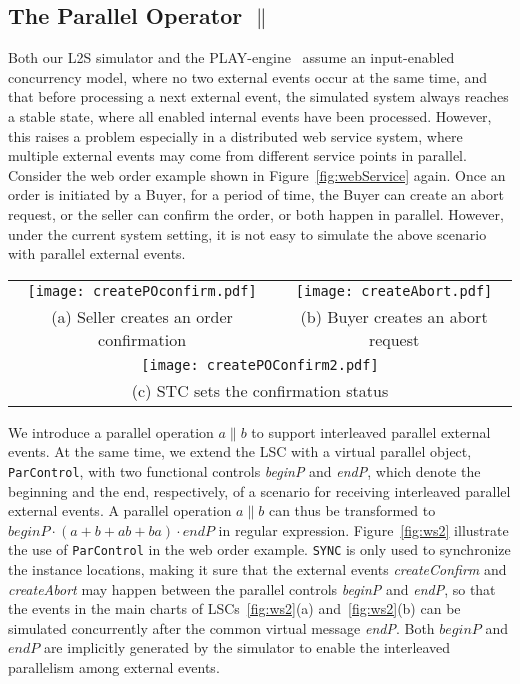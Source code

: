 \documentclass[]{llncs}
\begin{document}
\subsection{The Parallel Operator $\|$}

Both our L2S simulator and the PLAY-engine~\cite{HM03}
assume an input-enabled concurrency model, where no two
external events occur at the same time, and that before processing
a next external event, the simulated system always reaches a stable state,
where all enabled internal events have been processed.
However, this raises a problem especially in a distributed web service system,
where multiple external events may come from different service points in parallel.
Consider the web order example shown in Figure~\ref{fig:webService} again.
Once an order is initiated by a Buyer, for a period of time,
the Buyer can create an abort request, or the seller can confirm
the order, or both happen in parallel.
However, under the current system setting, it is not easy
to simulate the above scenario with parallel external events.

\begin{figure*}[!ht]
	\centering
	\begin{tabular}{cc}
		\texttt{[image: createPOconfirm.pdf]}
		&
		\texttt{[image: createAbort.pdf]} \\
	  (a) Seller creates an order confirmation
	  &
	  (b) Buyer creates an abort request \\
	
\multicolumn{2}{c}{
	  \texttt{[image: createPOConfirm2.pdf]}} \\
\multicolumn{2}{c}{
		  (c) STC sets the confirmation status}
	\end{tabular}
\caption{An LSC specification with a Parallel object}
\label{fig:ws2}
\end{figure*}

We introduce a parallel operation $a \| b$ to support
interleaved parallel external events.
At the same time, we extend the LSC with a virtual parallel object,
{\tt ParControl}, with two functional controls {\em beginP} and {\em endP},
which denote the beginning
and the end, respectively, of a scenario for receiving
interleaved parallel external events. A parallel operation
$a\|b$ can thus be transformed to $beginP\cdot(a+b+ab+ba)\cdot endP$ in regular
expression. Figure~\ref{fig:ws2} illustrate the use of {\tt ParControl} in
the web order example. {\tt SYNC} is only used to synchronize the
instance locations, making it sure that the external events {\em createConfirm} and
{\em createAbort} may happen between the parallel controls {\em beginP} and
{\em endP}, so that the events in the main charts of LSCs~\ref{fig:ws2}(a)
and~\ref{fig:ws2}(b) can be simulated concurrently after the common
virtual message {\em endP}. Both $beginP$ and $endP$ are implicitly
generated by the simulator to enable the interleaved parallelism among
external events.
\end{document}
